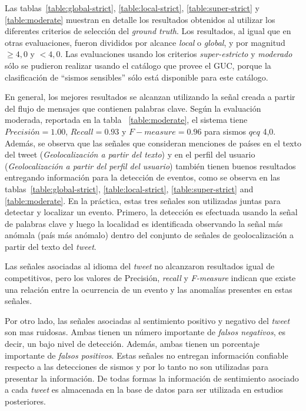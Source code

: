 Las tablas~\ref{table:global-strict}, \ref{table:local-strict}, \ref{table:super-strict} y \ref{table:moderate} muestran en detalle los resultados obtenidos al utilizar los diferentes criterios de selección del {\em ground truth}.
%
Los resultados, al igual que en otras evaluaciones, fueron divididos por alcance {\em local} o {\em global}, y por magnitud $\geq 4,0$ y $< 4,0$. Las evaluaciones usando los criterios {\em super-estricto} y {\em moderado} sólo se pudieron realizar usando el catálogo que provee el GUC, porque la clasificación de ``sismos sensibles'' sólo está disponible para este catálogo.


En general, los mejores resultados se alcanzan utilizando la señal creada a partir del flujo de mensajes que contienen palabras clave. Según la evaluación moderada, reportada en la tabla ~\ref{table:moderate}, el sistema tiene $Precisión=1.00$, $Recall=0.93$ y $F-measure=0.96$ para sismos $qeq$ 4,0. 
Además, se observa que las señales que consideran menciones de países en el texto del tweet ({\em Geolocalización a partir del texto}) y en el perfil del usuario ({\em Geolocalización a partir del perfil del usuario}) también tienen buenos resultados entregando información para la detección de eventos, como se observa en las tablas~\ref{table:global-strict}, \ref{table:local-strict}, \ref{table:super-strict} and \ref{table:moderate}.
En la práctica, estas tres señales son utilizadas juntas para detectar y localizar un evento. Primero, la detección es efectuada usando la señal de palabras clave y luego la localidad es identificada observando la señal más anómala (país más anómalo) dentro del conjunto de señales de geolocalización a partir del texto del \textit{tweet}.

Las señales asociadas al idioma del \textit{tweet} no alcanzaron resultados igual de competitivos, pero los valores de Precisión, \textit{recall} y \textit{F-measure} indican que existe una relación entre la ocurrencia de un evento y las anomalías presentes en estas señales.

Por otro lado, las señales asociadas al sentimiento positivo y negativo del \textit{tweet} son mas ruidosas. Ambas tienen un número importante de {\em falsos negativos}, es decir, un bajo nivel de detección. Además, ambas tienen un porcentaje importante de {\em falsos positivos}. Estas señales no entregan información confiable respecto a las detecciones de sismos y por lo tanto no son utilizadas para presentar la información. De todas formas la información de sentimiento asociado a cada {\em tweet} es almacenada en la base de datos para ser utilizada en estudios posteriores. 


